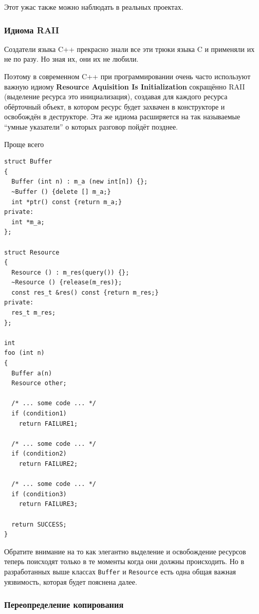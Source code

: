 \documentclass[a4paper,12pt,oneside]{article}
\begin{document}
Этот ужас также можно наблюдать в реальных проектах.

\subsubsection{Идиома RAII}\label{RAII}

Создатели языка C++ прекрасно знали все эти трюки языка C и применяли их не по разу. Но зная их, они их не любили. 

Поэтому в современном C++ при программировании очень часто используют важную идиому \textbf{Resource Aquisition Is Initialization} сокращённо RAII (выделение ресурса это инициализация), создавая для каждого ресурса обёрточный объект, в котором ресурс будет захвачен в конструкторе и освобождён в деструкторе. Эта же идиома расширяется на так называемые ``умные указатели'' о которых разговор пойдёт позднее.

Проще всего

\begin{lstlisting}
struct Buffer
{
  Buffer (int n) : m_a (new int[n]) {};
  ~Buffer () {delete [] m_a;}
  int *ptr() const {return m_a;}
private:
  int *m_a;
};

struct Resource
{
  Resource () : m_res(query()) {};
  ~Resource () {release(m_res)};
  const res_t &res() const {return m_res;}
private:
  res_t m_res;
};

int
foo (int n)
{
  Buffer a(n)
  Resource other;

  /* ... some code ... */
  if (condition1)
    return FAILURE1;

  /* ... some code ... */
  if (condition2)
    return FAILURE2;

  /* ... some code ... */
  if (condition3)
    return FAILURE3;

  return SUCCESS;
}

\end{lstlisting}

Обратите внимание на то как элегантно выделение и освобождение ресурсов теперь поисходят только в те моменты когда они должны происходить. Но в разработанных выше классах \lstinline!Buffer! и \lstinline!Resource! есть одна общая важная уязвимость, которая будет пояснена далее.

\subsubsection{Переопределение копирования}\label{CopyConstr}
\end{document}
